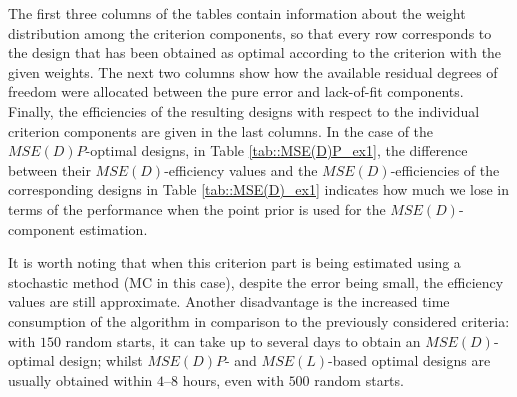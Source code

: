The first three columns of the tables contain information about the weight distribution among the criterion components, so that every row corresponds to the design that has been obtained as optimal according to the criterion with the given weights. The next two columns show how the available residual degrees of freedom were allocated between the pure error and lack-of-fit components. Finally, the efficiencies of the resulting designs with respect to the individual criterion components are given in the last columns. In the case of the $MSE(D)P$-optimal designs, in Table \ref{tab::MSE(D)P_ex1}, the difference between their $MSE(D)$-efficiency values and the $MSE(D)$-efficiencies of the corresponding designs in Table \ref{tab::MSE(D)_ex1} indicates how much we lose in terms of the performance when the point prior is used for the $MSE(D)$-component estimation. 

It is worth noting that when this criterion part is being estimated using a stochastic method (MC in this case), despite the error being small, the efficiency values are still approximate. Another disadvantage is the increased time consumption of the algorithm in comparison to the previously considered criteria: with $150$ random starts, it can take up to several days to obtain an $MSE(D)$-optimal design; whilst $MSE(D)P$- and $MSE(L)$-based optimal designs are usually obtained within $4$--$8$ hours, even with $500$ random starts. 

